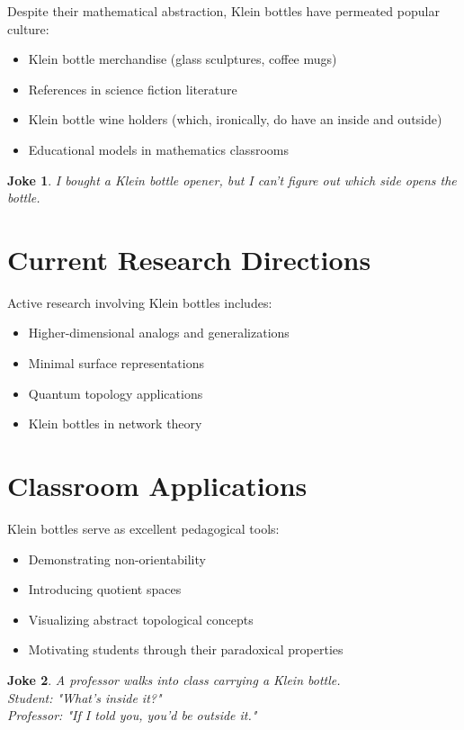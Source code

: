 \documentclass{article}
\newtheorem{joke}{Joke}
\begin{document}
Despite their mathematical abstraction, Klein bottles have permeated popular culture:

\begin{itemize}
    \item Klein bottle merchandise (glass sculptures, coffee mugs)
    \item References in science fiction literature
    \item Klein bottle wine holders (which, ironically, do have an inside and outside)
    \item Educational models in mathematics classrooms
\end{itemize}

\begin{joke}
    I bought a Klein bottle opener, but I can't figure out which side opens the bottle.
\end{joke}

\section{Current Research Directions}

Active research involving Klein bottles includes:

\begin{itemize}
    \item Higher-dimensional analogs and generalizations
    \item Minimal surface representations
    \item Quantum topology applications
    \item Klein bottles in network theory
\end{itemize}

\section{Classroom Applications}

Klein bottles serve as excellent pedagogical tools:

\begin{itemize}
    \item Demonstrating non-orientability
    \item Introducing quotient spaces
    \item Visualizing abstract topological concepts
    \item Motivating students through their paradoxical properties
\end{itemize}

\begin{joke}
    A professor walks into class carrying a Klein bottle.\\
    Student: "What's inside it?"\\
    Professor: "If I told you, you'd be outside it."
\end{joke}
\end{document}
